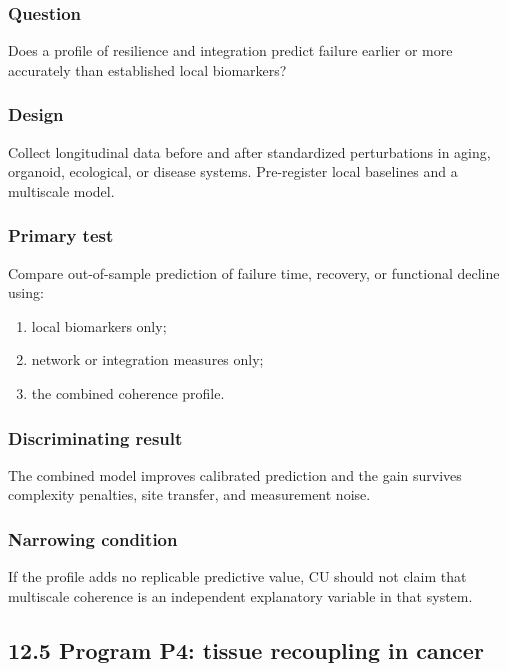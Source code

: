 \documentclass[
  11pt,
]{article}
\providecommand{\tightlist}{%
  \setlength{\itemsep}{0pt}\setlength{\parskip}{0pt}}
\begin{document}
\subsubsection{Question}\label{question-2}

Does a profile of resilience and integration predict failure earlier or
more accurately than established local biomarkers?

\subsubsection{Design}\label{design-2}

Collect longitudinal data before and after standardized perturbations in
aging, organoid, ecological, or disease systems. Pre-register local
baselines and a multiscale model.

\subsubsection{Primary test}\label{primary-test}

Compare out-of-sample prediction of failure time, recovery, or
functional decline using:

\begin{enumerate}
\def\labelenumi{\arabic{enumi}.}
\tightlist
\item
  local biomarkers only;
\item
  network or integration measures only;
\item
  the combined coherence profile.
\end{enumerate}

\subsubsection{Discriminating result}\label{discriminating-result-2}

The combined model improves calibrated prediction and the gain survives
complexity penalties, site transfer, and measurement noise.

\subsubsection{Narrowing condition}\label{narrowing-condition-1}

If the profile adds no replicable predictive value, CU should not claim
that multiscale coherence is an independent explanatory variable in that
system.

\subsection{12.5 Program P4: tissue recoupling in
cancer}\label{program-p4-tissue-recoupling-in-cancer}
\end{document}
